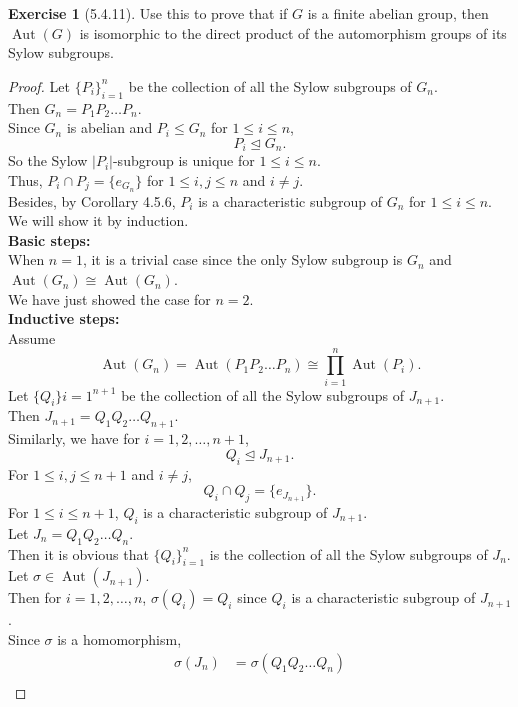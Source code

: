 \documentclass{amsart}
\theoremstyle{plain}
\theoremstyle{definition}
\newtheorem{exer}[lem]{Exercise}
\begin{document}
\begin{exer}[5.4.11]
Use this to prove that if $G$ is a finite abelian group, then $\operatorname{Aut}(G)$ is isomorphic to the direct product of the automorphism groups of its Sylow subgroups.
\begin{proof}
	Let $\{P_i\}_{i=1}^n$ be the collection of all the Sylow subgroups of $G_n$.\\
	Then $G_n =  P_1P_2\ldots P_n$.\\
	Since $G_n$ is abelian and $P_i \leq G_n$ for $1\leq i \leq n$,\\
	\[P_i \unlhd G_n.\]
	So the Sylow $|P_i|$-subgroup is unique for $1\leq i \leq n$. \\
	Thus, $P_i \cap P_j = \{e_{G_n}\}$ for $1 \leq i,j \leq n$ and $i\neq j$.\\
	Besides, by Corollary 4.5.6, $P_i$ is a characteristic subgroup of $G_n$ for $1\leq i \leq n$.\\ 
	We will show it by induction.\\
	\textbf{Basic steps:}\\
	When $n=1$, it is a trivial case since the only Sylow subgroup is $G_n$ and $ \operatorname{Aut}(G_n) \cong \operatorname{Aut}(G_n)$.\\
	We have just showed the case for $n=2$.\\
	\textbf{Inductive steps:}\\
	Assume 
	\[\operatorname{Aut}(G_n)  = \operatorname{Aut}(P_1P_2\ldots P_n) \cong \prod_{i=1}^{n} \operatorname{Aut}(P_i).\]
    Let $\{Q_i\}{i=1}^{n+1}$ be the collection of all the Sylow subgroups of $J_{n+1}$.\\
	Then $J_{n+1} =  Q_1Q_2\ldots Q_{n+1}$.\\
	Similarly, we have for $i=1,2,\ldots,n+1$,
	\[Q_i \unlhd J_{n+1}.\]
	For $1 \leq i,j \leq n+1$ and $i\neq j$,
	\[Q_i \cap Q_j = \{e_{J_{n+1}}\}.\]
	For $1\leq i \leq n+1$, $Q_i$ is a characteristic subgroup of $J_{n+1}$.\\
	Let $J_n = Q_1Q_2\ldots Q_n$.\\
	Then it is obvious that $\{Q_i\}_{i=1}^{n}$ is the collection of all the Sylow subgroups of $J_{n}$. \\
	Let $\sigma \in \operatorname{Aut}(J_{n+1})$.\\
	Then for $i = 1,2,\ldots,n$, $\sigma(Q_i)  = Q_i$ since $Q_i$ is a characteristic subgroup of $J_{n+1}$.\\ 
	Since $\sigma$ is a homomorphism,
	\begin{align*}
	 	\sigma(J_n) &= \sigma(Q_1Q_2\ldots Q_n)\\

\end{align*}
\end{proof}
\end{exer}
\end{document}
